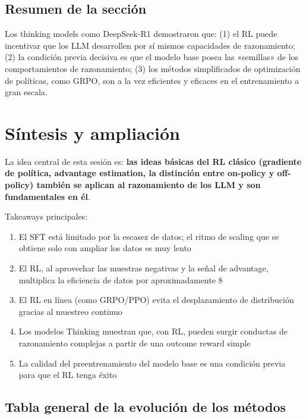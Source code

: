 \documentclass[a4paper]{article}
\begin{document}
\subsection{Resumen de la sección}

Los thinking models como DeepSeek-R1 demostraron que: (1) el RL puede incentivar que los LLM desarrollen por sí mismos capacidades de razonamiento; (2) la condición previa decisiva es que el modelo base posea las «semillas» de los comportamientos de razonamiento; (3) los métodos simplificados de optimización de políticas, como GRPO, son a la vez eficientes y eficaces en el entrenamiento a gran escala.
\section{Síntesis y ampliación}

La idea central de esta sesión es: \textbf{las ideas básicas del RL clásico (gradiente de política, advantage estimation, la distinción entre on-policy y off-policy) también se aplican al razonamiento de los LLM y son fundamentales en él}.

Takeaways principales:
\begin{enumerate}
    \item El SFT está limitado por la escasez de datos; el ritmo de scaling que se obtiene solo con ampliar los datos es muy lento
    \item El RL, al aprovechar las muestras negativas y la señal de advantage, multiplica la eficiencia de datos por aproximadamente 8
    \item El RL en línea (como GRPO/PPO) evita el desplazamiento de distribución gracias al muestreo continuo
    \item Los modelos Thinking muestran que, con RL, pueden surgir conductas de razonamiento complejas a partir de una outcome reward simple
    \item La calidad del preentrenamiento del modelo base es una condición previa para que el RL tenga éxito
\end{enumerate}

\subsection{Tabla general de la evolución de los métodos}
\end{document}
